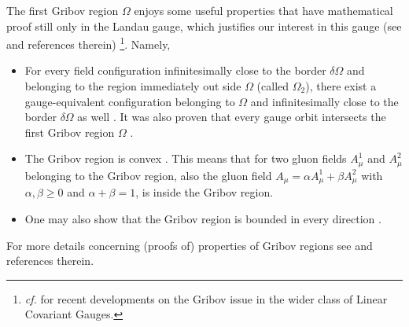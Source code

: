 The first Gribov region $\Omega$ enjoys some useful properties that have mathematical proof
still only in the Landau gauge, which justifies our interest in this gauge (see
\cite{Vandersickel:2012tz} and references therein) \footnote{{\it cf.}
\cite{Capri:2016aqq,Capri:2015nzw,Capri:2015pja,Capri:2015ixa} for recent developments on the
Gribov issue in the wider class of Linear Covariant Gauges.}. Namely,
\begin{itemize}
\item 
For every field configuration infinitesimally close to the border $\delta\Omega$  and belonging to the region immediately out side $\Omega$ (called $\Omega_{2}$), there exist a gauge-equivalent configuration belonging to $\Omega$ and infinitesimally close to the border $\delta\Omega$ as well \cite{Gribov:1977wm}. It was also proven that every gauge orbit intersects the first Gribov region $\Omega$ \cite{Capri:2005dy,Zwanziger:1982na}.

\item
The Gribov region is convex \cite{Zwanziger:2003cf}. This means that for two gluon fields $A_\mu^1$ and $A_\mu^2$ belonging to the Gribov region, also the gluon field $A_\mu = \alpha A_\mu^1 + \beta A_\mu^2$ with $\alpha, \beta \geq 0$ and $\alpha + \beta  =1$, is inside the Gribov region.

\item
One may also show that the Gribov region is bounded in every direction \cite{Zwanziger:2003cf}.
\end{itemize}

For more details concerning (proofs of) properties of Gribov regions see \cite{Vandersickel:2012tz} and references therein.
















